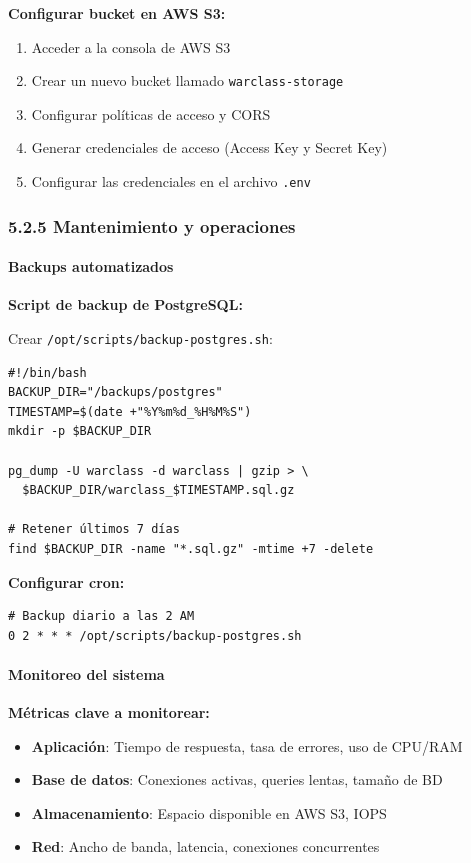 \textbf{Configurar bucket en AWS S3:}

\begin{enumerate}
	\item Acceder a la consola de AWS S3
	\item Crear un nuevo bucket llamado \texttt{warclass-storage}
	\item Configurar políticas de acceso y CORS
	\item Generar credenciales de acceso (Access Key y Secret Key)
	\item Configurar las credenciales en el archivo \texttt{.env}
\end{enumerate}

\subsubsection{5.2.5 Mantenimiento y operaciones}

\paragraph{Backups automatizados}

\textbf{Script de backup de PostgreSQL:}

Crear \texttt{/opt/scripts/backup-postgres.sh}:

\begin{verbatim}
#!/bin/bash
BACKUP_DIR="/backups/postgres"
TIMESTAMP=$(date +"%Y%m%d_%H%M%S")
mkdir -p $BACKUP_DIR

pg_dump -U warclass -d warclass | gzip > \
  $BACKUP_DIR/warclass_$TIMESTAMP.sql.gz

# Retener últimos 7 días
find $BACKUP_DIR -name "*.sql.gz" -mtime +7 -delete
\end{verbatim}

\textbf{Configurar cron:}

\begin{verbatim}
# Backup diario a las 2 AM
0 2 * * * /opt/scripts/backup-postgres.sh
\end{verbatim}

\paragraph{Monitoreo del sistema}

\textbf{Métricas clave a monitorear:}

\begin{itemize}
	\item \textbf{Aplicación}: Tiempo de respuesta, tasa de errores, uso de CPU/RAM
	\item \textbf{Base de datos}: Conexiones activas, queries lentas, tamaño de BD
	\item \textbf{Almacenamiento}: Espacio disponible en AWS S3, IOPS
	\item \textbf{Red}: Ancho de banda, latencia, conexiones concurrentes
\end{itemize}

